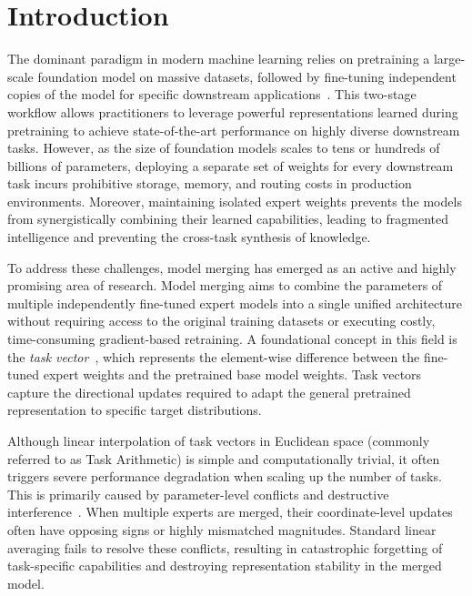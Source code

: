 \documentclass{article}
\theoremstyle{plain}
\theoremstyle{definition}
\theoremstyle{remark}
\begin{document}
\section{Introduction}
\label{sec:intro}

The dominant paradigm in modern machine learning relies on pretraining a large-scale foundation model on massive datasets, followed by fine-tuning independent copies of the model for specific downstream applications~\cite{wortsman22a, ilharco23, Wortsman2022ModelSA}. This two-stage workflow allows practitioners to leverage powerful representations learned during pretraining to achieve state-of-the-art performance on highly diverse downstream tasks. However, as the size of foundation models scales to tens or hundreds of billions of parameters, deploying a separate set of weights for every downstream task incurs prohibitive storage, memory, and routing costs in production environments. Moreover, maintaining isolated expert weights prevents the models from synergistically combining their learned capabilities, leading to fragmented intelligence and preventing the cross-task synthesis of knowledge.

To address these challenges, model merging has emerged as an active and highly promising area of research. Model merging aims to combine the parameters of multiple independently fine-tuned expert models into a single unified architecture without requiring access to the original training datasets or executing costly, time-consuming gradient-based retraining. A foundational concept in this field is the \emph{task vector}~\cite{ilharco23}, which represents the element-wise difference between the fine-tuned expert weights and the pretrained base model weights. Task vectors capture the directional updates required to adapt the general pretrained representation to specific target distributions.

Although linear interpolation of task vectors in Euclidean space (commonly referred to as Task Arithmetic) is simple and computationally trivial, it often triggers severe performance degradation when scaling up the number of tasks. This is primarily caused by parameter-level conflicts and destructive interference~\cite{yadav24, yu24, Yadav2023TIESMergingRI, Gargiulo2024TaskSV}. When multiple experts are merged, their coordinate-level updates often have opposing signs or highly mismatched magnitudes. Standard linear averaging fails to resolve these conflicts, resulting in catastrophic forgetting of task-specific capabilities and destroying representation stability in the merged model.
\end{document}
